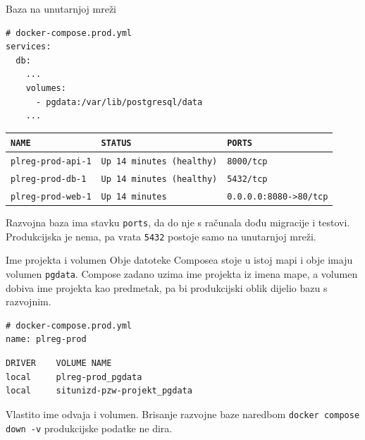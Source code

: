 \begin{frame}[fragile]{Baza na unutarnjoj mreži}
\begin{lstlisting}
# docker-compose.prod.yml
services:
  db:
    ...
    volumes:
      - pgdata:/var/lib/postgresql/data
    ...
\end{lstlisting}

\vspace{0.2em}
{\small
\setlength{\tabcolsep}{8pt}
\begin{tabular}{@{}lll@{}}
  \toprule
  \texttt{NAME} & \texttt{STATUS} & \texttt{PORTS} \\
  \midrule
  \texttt{plreg-prod-api-1} & \texttt{Up 14 minutes (healthy)} & \texttt{8000/tcp} \\
  \texttt{plreg-prod-db-1} & \texttt{Up 14 minutes (healthy)} & \texttt{5432/tcp} \\
  \texttt{plreg-prod-web-1} & \texttt{Up 14 minutes} & \texttt{0.0.0.0:8080->80/tcp} \\
  \bottomrule
\end{tabular}
}

\vspace{0.3em}
Razvojna baza ima stavku \texttt{ports}, da do nje s računala dođu migracije i testovi. Produkcijska je nema, pa vrata \texttt{5432} postoje samo na unutarnjoj mreži.
\end{frame}

\begin{frame}[fragile]{Ime projekta i volumen}
Obje datoteke Composea stoje u istoj mapi i obje imaju volumen \texttt{pgdata}. Compose zadano uzima ime projekta iz imena mape, a volumen dobiva ime projekta kao predmetak, pa bi produkcijski oblik dijelio bazu s razvojnim.

\begin{lstlisting}
# docker-compose.prod.yml
name: plreg-prod
\end{lstlisting}

\begin{lstlisting}
DRIVER    VOLUME NAME
local     plreg-prod_pgdata
local     situnizd-pzw-projekt_pgdata
\end{lstlisting}

\vspace{0.3em}
Vlastito ime odvaja i volumen. Brisanje razvojne baze naredbom \texttt{docker compose down -v} produkcijske podatke ne dira.
\end{frame}

